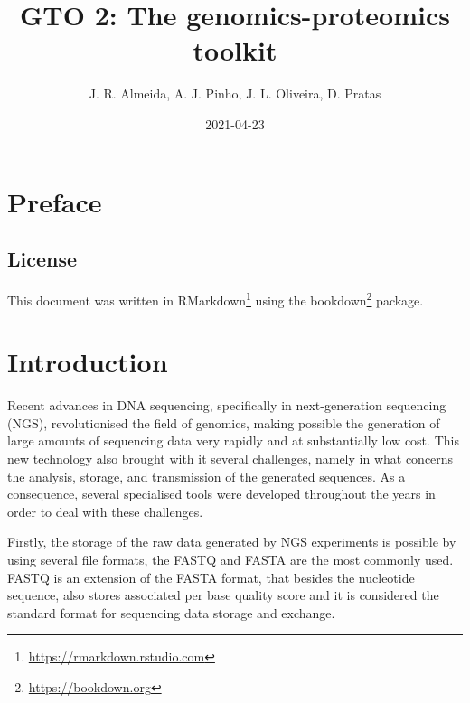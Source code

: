 \documentclass[11pt,]{krantz}
\title{GTO 2: The genomics-proteomics toolkit}
\author{J. R. Almeida, A. J. Pinho, J. L. Oliveira, D. Pratas}
\date{2021-04-23}
\renewcommand{\href}[2]{#2\footnote{\url{#1}}}
\begin{document}
\maketitle

{
\hypersetup{linkcolor=black}
\setcounter{tocdepth}{2}
\tableofcontents
}
\listoftables
\listoffigures
\chapter*{Preface}\label{preface}


\section*{License}\label{license}


This document was written in \href{https://rmarkdown.rstudio.com}{RMarkdown} using the \href{https://bookdown.org}{bookdown} package.

\chapter{Introduction}\label{introduction}

Recent advances in DNA sequencing, specifically in next-generation sequencing (NGS), revolutionised the field of genomics, making possible the generation of large amounts of sequencing data very rapidly and at substantially low cost\citep{mardis2017dna}. This new technology also brought with it several challenges, namely in what concerns the analysis, storage, and transmission of the generated sequences\citep[\citet{liu2012comparison}]{brouwer2016current}. As a consequence, several specialised tools were developed throughout the years in order to deal with these challenges.

Firstly, the storage of the raw data generated by NGS experiments is possible by using several file formats, the FASTQ and FASTA are the most commonly used\citep{zhang2016overview}. FASTQ is an extension of the FASTA format, that besides the nucleotide sequence, also stores associated per base quality score and it is considered the standard format for sequencing data storage and exchange\citep{cock2009sanger}.
\end{document}
